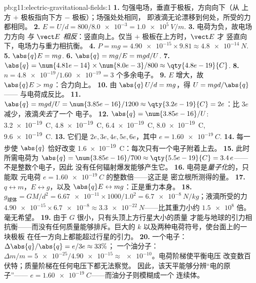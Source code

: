 \begin{solution}{pb:g11:electric-gravitational-fields:1}
\textbf{1.} 匀强电场，垂直于极板，方向向下（从
上方 $+$ 极板指向下方 $-$ 极板）；场强处处相同，
即液滴无论漂移到何处，所受的力都相同。
\textbf{2.} $E = U/d = 800 / \num{8.0e-3} = \qty{1.0e5}{V/m}$.
\textbf{3.} 电荷为负，故电场力方向
\emph{与 $\vect E$ 相反}：竖直向上。仅当 $+$ 极板在上方时，$\vect E$ 才
竖直向下，电场力与重力相抗衡。
\textbf{4.} $P = mg = \num{4.90e-15} \times 9.81 \approx
\qty{4.8e-14}{N}$.
\textbf{5.} $\abs{q}E = mg$.
\textbf{6.} $\abs{q} = mg/E = mgd/U$.
\textbf{7.} $\abs{q} = \num{4.81e-14} \times \num{8.0e-3} / 800
\approx \qty{4.8e-19}{C}$.
\textbf{8.} $n = \num{4.8e-19} / \num{1.60e-19} = 3$ 个多余电子。
\textbf{9.} $E$ 增大，故 $\abs{q}E > mg$：合力向上。
\textbf{10.} 由 $\abs{q}\,U/d = mg$，得 $U = mgd/\abs{q}$——
与电荷成反比。
\textbf{11.} $\abs{q} = mgd/U = \num{3.85e-16}/1200 \approx
\qty{3.2e-19}{C} = 2e$：比 $3e$ 减少，液滴\emph{失去}了一个
电子。
\textbf{12.} $\abs{q} = \num{3.85e-16}/U$: \qty{3.2e-19}{C},
\qty{4.8e-19}{C}, \qty{6.4e-19}{C}, \qty{8.0e-19}{C},
\qty{9.6e-19}{C}.
\textbf{13.} 它们是 $2e, 3e, 4e, 5e, 6e$，其中
$e = \qty{1.60e-19}{C}$.
\textbf{14.} 每一步使 $\abs{q}$ 恰好改变
\qty{1.6e-19}{C}：每次只有一个电子附着上去。
\textbf{15.} 此时所需电荷为 $\abs{q} = \num{3.85e-16}/700 \approx
\qty{5.5e-19}{C} = 3.4\,e$——不是整数个电子，因此
没有任何辐射爆发能够产生它。
\textbf{16.} 电荷是\emph{量子化}的，只能取
元电荷 $e = \qty{1.60e-19}{C}$ 的整数倍——这正是
密立根所测得的量。
\textbf{17.} $q \leftrightarrow m$，$E \leftrightarrow g$，以及
$\abs{q}E \leftrightarrow mg$：正是重力本身。
\textbf{18.} $g_{\text{球体}} = GM/d^2 = \num{6.67e-11} \times 1000 /
1.0^2 = \qty{6.7e-8}{N/kg}$；液滴所受的力
$\num{4.90e-15} \times \num{6.7e-8} \approx \qty{3.3e-22}{N}$——比其重力小约
$\num{1.5e8}$ 倍。毫无希望。
\textbf{19.} 由于 $G$ 很小，只有头顶上方行星大小的质量
才能与地球的引力相抗衡——而没有任何质量能够排斥。巨大的 $k$
以及两种电荷符号，使台面上的一块极板
在任一方向上都能超过行星的引力。
\textbf{20.} 一个电子：$\Delta\abs{q}/\abs{q} = e/3e \approx 33\%$；
一个油分子：$\Delta m/m = \num{5e-25} / \num{4.90e-15}
\approx \num{e-10}$。电荷阶梯使平衡电压
改变数百伏特；质量阶梯在任何电压下都无法察觉。
因此，该天平能够分辨“电的原子”——
$e = \qty{1.60e-19}{C}$——而油分子则模糊成一个
连续体。
\end{solution}
